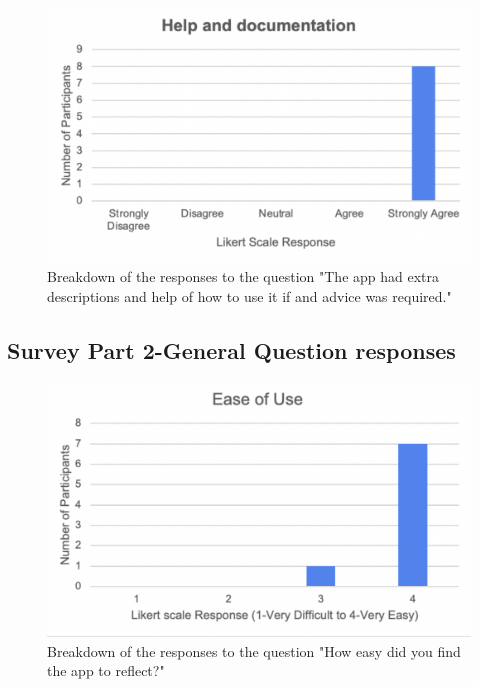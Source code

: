 \documentclass{l4proj}
\begin{document}
\begin{appendices}
\begin{figure}[H]
    \begin{centering}
    \includegraphics[scale=0.5]{images/heuristic10.pdf}
    \caption{Breakdown of the responses to the question "The app had extra descriptions and help of how to use it if and advice was required."}
    \label{fig: heuristic10}
    \end{centering}
\end{figure}

\subsection{Survey Part 2-General Question responses}

\begin{figure}[H]
    \begin{centering}
    \includegraphics[scale=0.5]{images/userSurvey5.pdf}
    \caption{Breakdown of the responses to the question "How easy did you find the app to reflect?"}
    \label{fig: userSurvey5}
    \end{centering}
\end{figure}


\end{appendices}
\end{document}
